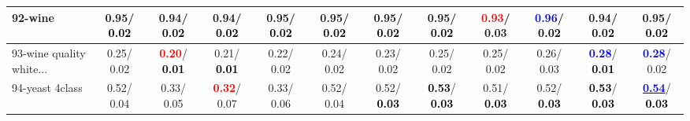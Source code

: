 \begin{table}[h]
\begin{center}
{\begin{tabular}{lc|c|c|c|c|c|c|c|c|c|c}
92-wine &   0.95/\textcolor{black}{\textbf{  0.02}} &   0.94/\textcolor{black}{\textbf{  0.02}} &   0.94/\textcolor{black}{\textbf{  0.02}} &   0.95/\textcolor{black}{\textbf{  0.02}} &   0.95/\textcolor{black}{\textbf{  0.02}} &   0.95/\textcolor{black}{\textbf{  0.02}} &   0.95/\textcolor{black}{\textbf{  0.02}} & \textcolor{red}{\textbf{  0.93}}/  0.03 & \textcolor{blue}{\textbf{  0.96}}/\textcolor{black}{\textbf{  0.02}} &   0.94/\textcolor{black}{\textbf{  0.02}} &   0.95/\textcolor{black}{\textbf{  0.02}} \\ \hline
93-wine quality white... &   0.25/  0.02 & \textcolor{red}{\textbf{  0.20}}/\textcolor{black}{\textbf{  0.01}} &   0.21/\textcolor{black}{\textbf{  0.01}} &   0.22/  0.02 &   0.24/  0.02 &   0.23/  0.02 &   0.25/  0.02 &   0.25/  0.02 &   0.26/  0.03 & \textcolor{blue}{\textbf{  0.28}}/\textcolor{black}{\textbf{  0.01}} & \textcolor{blue}{\textbf{  0.28}}/  0.02 \\
94-yeast 4class &   0.52/  0.04 &   0.33/  0.05 & \textcolor{red}{\textbf{  0.32}}/  0.07 &   0.33/  0.06 &   0.52/  0.04 &   0.52/\textcolor{black}{\textbf{  0.03}} & \textcolor{black}{\textbf{  0.53}}/\textcolor{black}{\textbf{  0.03}} &   0.51/\textcolor{black}{\textbf{  0.03}} &   0.52/\textcolor{black}{\textbf{  0.03}} & \textcolor{black}{\textbf{  0.53}}/\textcolor{black}{\textbf{  0.03}} & \underline{\textcolor{blue}{\textbf{  0.54}}}/\textcolor{black}{\textbf{  0.03}} \\\end{tabular}
}\label{strats2bNB}
\end{center}
\end{table}
                                     